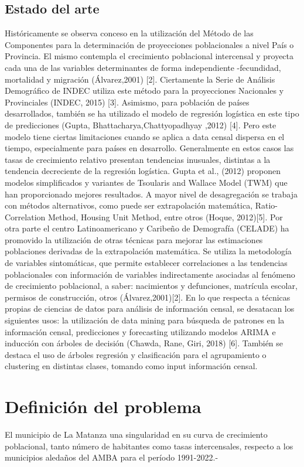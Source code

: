 \documentclass{article}
\theoremstyle{mytheoremstyle}
\theoremstyle{mytheoremstyle}
\theoremstyle{myproblemstyle}
\begin{document}
  \subsection{Estado del arte}
  Históricamente se observa conceso en la utilización del Método de las Componentes para la determinación de proyecciones poblacionales a nivel País o Provincia. El mismo contempla el crecimiento poblacional intercensal y proyecta cada una de las variables determinantes de forma independiente -fecundidad, mortalidad y migración (Álvarez,2001) [2].  Ciertamente la Serie de Análisis Demográfico de INDEC utiliza este método para la proyecciones Nacionales y Provinciales (INDEC, 2015) [3]. 
Asimismo, para población de países desarrollados, también se ha utilizado el modelo de regresión logística en este tipo de predicciones (Gupta, Bhattacharya,Chattyopadhyay ,2012) [4]. Pero este modelo tiene ciertas limitaciones cuando se aplica a data censal dispersa en el tiempo, especialmente para países en desarrollo. Generalmente en estos casos las tasas de crecimiento relativo presentan tendencias inusuales, distintas a la tendencia decreciente de la regresión logística. Gupta et al., (2012) proponen modelos simplificados y variantes de Tsoularis and Wallace Model (TWM) que han proporcionado mejores resultados.
A mayor nivel de desagregación se trabaja con métodos alternativos, como puede ser extrapolación matemática, Ratio- Correlation Method, Housing Unit Method, entre otros (Hoque, 2012)[5]. Por otra parte el centro Latinoamericano y Caribeño de Demografía (CELADE) ha promovido la utilización de otras técnicas para mejorar las estimaciones poblaciones derivadas de la extrapolación matemática. Se utiliza la metodología de variables sintomáticas, que permite establecer correlaciones a las tendencias poblacionales con información de variables indirectamente asociadas al fenómeno de crecimiento poblacional, a saber: nacimientos y defunciones, matrícula escolar, permisos de construcción, otros (Álvarez,2001)[2].  
En lo que respecta a técnicas propias de ciencias de datos para análisis de información censal, se desatacan los siguientes usos: la utilización de data mining para búsqueda de patrones en la información censal, predicciones y forecasting utilizando modelos ARIMA e inducción con árboles de decisión (Chawda, Rane, Giri, 2018) [6]. También se destaca el uso de árboles regresión y clasificación para el agrupamiento o clustering en distintas clases, tomando como input información censal.

\section{Definición del problema }
El municipio de La Matanza una singularidad en su curva de crecimiento poblacional, tanto número de habitantes como tasas intercensales, respecto a los 
municipios aledaños del AMBA para el período 1991-2022.-  
\end{document}
